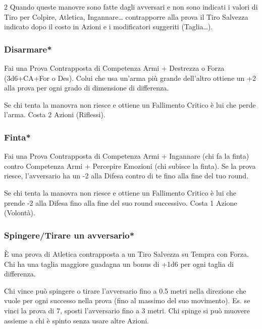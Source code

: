 \begin{multicols}{2}
Quando queste manovre sono fatte dagli avversari e non sono indicati i valori di Tiro per Colpire, Atletica, Ingannare… contrapporre alla prova il Tiro Salvezza indicato dopo il costo in Azioni e i modificatori suggeriti (Taglia…).

\medskip

\subsubsection{Disarmare*}\label{disarmare}\hypertarget{disarmare}{}

Fai una Prova Contrapposta di Competenza Armi + Destrezza o Forza (3d6+CA+For o Des). Colui che usa un'arma più grande dell'altro ottiene un +2 alla prova per ogni grado di dimensione di differenza.

Se chi tenta la manovra non riesce e ottiene un Fallimento Critico è lui che perde l'arma. Costa 2 Azioni (Riflessi).

\subsubsection{Finta*} \label{finta}\hypertarget{finta}{}

Fai una Prova Contrapposta di Competenza Armi + Ingannare (chi fa la finta) contro Competenza Armi + Percepire Emozioni (chi subisce la finta). Se la prova riesce, l'avversario ha un -2 alla Difesa contro di te fino alla fine del tuo round.

Se chi tenta la manovra non riesce e ottiene un Fallimento Critico è lui che prende -2 alla Difesa fino alla fine del suo round successivo. Costa 1 Azione (Volontà).


\subsubsection{Spingere/Tirare un avversario*} \label{spingereavversario}\hypertarget{spingereavversario}{}

È una prova di Atletica contrapposta a un Tiro Salvezza su Tempra con Forza. Chi ha una taglia maggiore guadagna un bonus di +1d6 per ogni taglia di differenza.

Chi vince può spingere o tirare l'avversario fino a 0.5 metri nella direzione che vuole per ogni successo nella prova (fino al massimo del suo movimento). Es. se vinci la prova di 7, sposti l'avversario fino a 3 metri. Chi spinge si può muovere assieme a chi è spinto senza usare altre Azioni.


\end{multicols}
